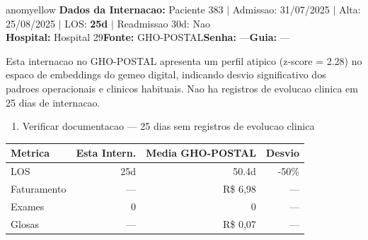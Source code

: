 \documentclass[a4paper,10pt]{article}
\begin{document}
\begin{anomalycard}[Internacao 2 | GHO-POSTAL | MODERADO (z=2.28)]{anomyellow}
\textbf{Dados da Internacao:} Paciente 383 $\mid$ Admissao: 31/07/2025 $\mid$ Alta: 25/08/2025 $\mid$ LOS: \textbf{25d} $\mid$ Readmissao 30d: Nao\\
\textbf{Hospital:} Hospital 29\quad\textbf{Fonte:} GHO-POSTAL\quad\textbf{Senha:} ---\quad\textbf{Guia:} ---\\
\vspace{2pt}\begin{tcolorbox}[colback=severityred!20,colframe=anomyellow,title={\textbf{Interpretacao de Negocio}},fonttitle=\bfseries\small,left=4pt,right=4pt,top=3pt,bottom=3pt]
{\small Esta internacao no GHO-POSTAL apresenta um perfil atipico (z-score = 2.28) no espaco de embeddings do gemeo digital, indicando desvio significativo dos padroes operacionais e clinicos habituais. Nao ha registros de evolucao clinica em 25 dias de internacao.}
\end{tcolorbox}
\begin{tcolorbox}[colback=severityyellow!30,colframe=anomorange,title={\textbf{Recomendacoes Especificas}},fonttitle=\bfseries\small,left=4pt,right=4pt,top=3pt,bottom=3pt]
\begin{enumerate}[nosep,leftmargin=16pt]
\item {\small Verificar documentacao --- 25 dias sem registros de evolucao clinica}
\end{enumerate}
\end{tcolorbox}
\begin{center}\begin{tabular}{l r r r}\toprule\textbf{Metrica} & \textbf{Esta Intern.} & \textbf{Media GHO-POSTAL} & \textbf{Desvio} \\\midrule
LOS & 25d & 50.4d & -50\% \\
Faturamento & --- & R\$ 6,98 & --- \\
Exames & 0 & 0 & --- \\
Glosas & --- & R\$ 0,07 & --- \\
\bottomrule\end{tabular}\end{center}


\end{anomalycard}
\end{document}
